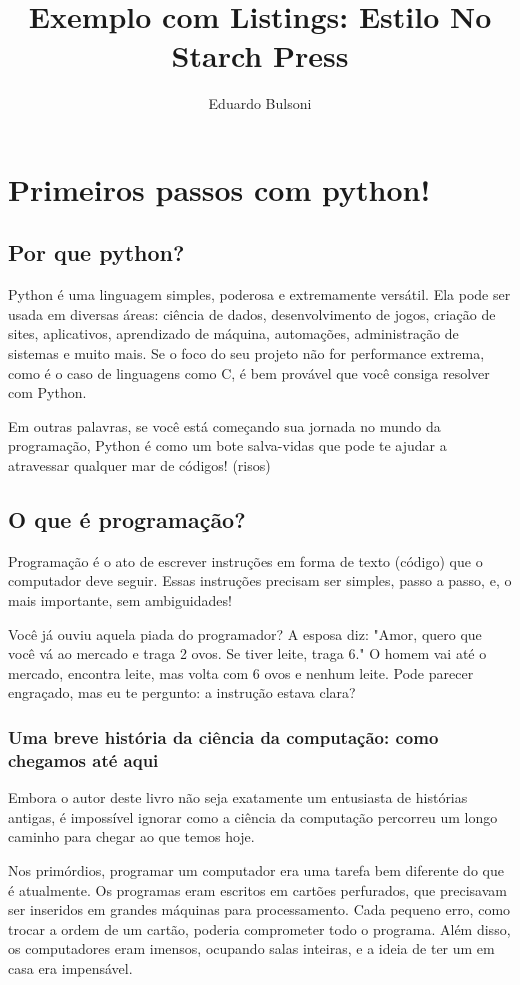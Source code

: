 \documentclass[12pt]{book}
\title{Exemplo com Listings: Estilo No Starch Press}
\author{Eduardo Bulsoni}
\date{}
\begin{document}
	
	\tableofcontents
	\chapter{Primeiros passos com python!}
	
	\section{Por que python?}
	
	Python é uma linguagem simples, poderosa e extremamente versátil. Ela pode ser usada em diversas áreas: ciência de dados, desenvolvimento de jogos, criação de sites, aplicativos, aprendizado de máquina, automações, administração de sistemas e muito mais. Se o foco do seu projeto não for performance extrema, como é o caso de linguagens como C, é bem provável que você consiga resolver com Python.
	
	Em outras palavras, se você está começando sua jornada no mundo da programação, Python é como um bote salva-vidas que pode te ajudar a atravessar qualquer mar de códigos! (risos) \newline
	
	\section{O que é programação?}
	
	Programação é o ato de escrever instruções em forma de texto (código) que o computador deve seguir. Essas instruções precisam ser simples, passo a passo, e, o mais importante, sem ambiguidades!
	
	Você já ouviu aquela piada do programador? A esposa diz: "Amor, quero que você vá ao mercado e traga 2 ovos. Se tiver leite, traga 6." O homem vai até o mercado, encontra leite, mas volta com 6 ovos e nenhum leite. Pode parecer engraçado, mas eu te pergunto: a instrução estava clara?
	
	\subsection{Uma breve história da ciência da computação: como chegamos até aqui}
	
	Embora o autor deste livro não seja exatamente um entusiasta de histórias antigas, é impossível ignorar como a ciência da computação percorreu um longo caminho para chegar ao que temos hoje.
	
	Nos primórdios, programar um computador era uma tarefa bem diferente do que é atualmente. Os programas eram escritos em cartões perfurados, que precisavam ser inseridos em grandes máquinas para processamento. Cada pequeno erro, como trocar a ordem de um cartão, poderia comprometer todo o programa. Além disso, os computadores eram imensos, ocupando salas inteiras, e a ideia de ter um em casa era impensável.
	
\end{document}
